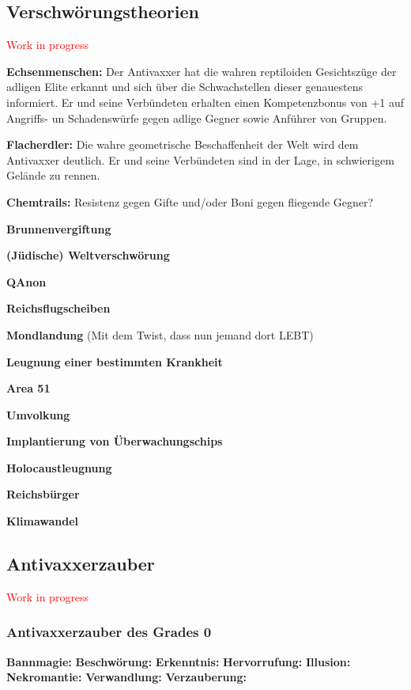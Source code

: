 \documentclass[
	ngerman,
	a4paper,
	10pt,
	twocolumn,
]{scrartcl}
\begin{document}
\subsection*{Verschwörungstheorien}

\textcolor{red}{Work in progress}

\textbf{Echsenmenschen:} Der Antivaxxer hat die wahren reptiloiden Gesichtszüge der adligen Elite erkannt und sich über die Schwachstellen dieser genauestens informiert. Er und seine Verbündeten erhalten einen Kompetenzbonus von +1 auf Angriffs- un Schadenswürfe gegen adlige Gegner sowie Anführer von Gruppen.

\textbf{Flacherdler:} Die wahre geometrische Beschaffenheit der Welt wird dem Antivaxxer deutlich. Er und seine Verbündeten sind in der Lage, in schwierigem Gelände zu rennen.

\textbf{Chemtrails:} Resistenz gegen Gifte und/oder Boni gegen fliegende Gegner?

\textbf{Brunnenvergiftung}

\textbf{(Jüdische) Weltverschwörung}

\textbf{QAnon}

\textbf{Reichsflugscheiben}

\textbf{Mondlandung} (Mit dem Twist, dass nun jemand dort LEBT)

\textbf{Leugnung einer bestimmten Krankheit}

\textbf{Area 51}

\textbf{Umvolkung}

\textbf{Implantierung von Überwachungschips}

\textbf{Holocaustleugnung}

\textbf{Reichsbürger}

\textbf{Klimawandel}

\subsection*{Antivaxxerzauber}

\textcolor{red}{Work in progress}

\subsubsection*{Antivaxxerzauber des Grades 0}

\textbf{Bannmagie:} \textit{}
\textbf{Beschwörung:} \textit{}
\textbf{Erkenntnis:} \textit{}
\textbf{Hervorrufung:} \textit{}
\textbf{Illusion:} \textit{}
\textbf{Nekromantie:} \textit{}
\textbf{Verwandlung:} \textit{}
\textbf{Verzauberung:} \textit{}
\end{document}

